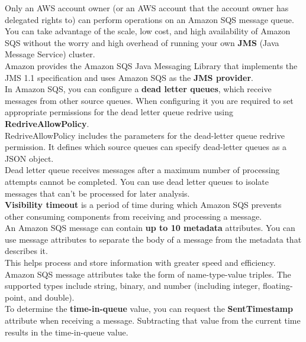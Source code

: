 \documentclass[12pt, letterpaper, twoside]{article}
\begin{document}
Only an AWS account owner (or an AWS account that the account owner has delegated rights to) can perform operations 
on an Amazon SQS message queue.\\

You can take advantage of the scale, low cost, and high availability of Amazon SQS without the worry and high 
overhead of running your own \textbf{JMS} (Java Message Service) cluster.\\
Amazon provides the Amazon SQS Java Messaging Library that implements the JMS 1.1 specification and uses 
Amazon SQS as the \textbf{JMS provider}.\\

In Amazon SQS, you can configure a \textbf{dead letter queues}, which receive messages from other source queues.
When configuring it you are required to set appropriate permissions for the dead letter queue redrive 
using \textbf{RedriveAllowPolicy}.\\
RedriveAllowPolicy includes the parameters for the dead-letter queue redrive permission. 
It defines which source queues can specify dead-letter queues as a JSON object.\\
Dead letter queue receives messages after a maximum number of processing attempts cannot be completed. 
You can use dead letter queues to isolate messages that can't be processed for later analysis.\\

\textbf{Visibility timeout} is a period of time during which Amazon SQS prevents other consuming components 
from receiving and processing a message.\\

An Amazon SQS message can contain \textbf{up to 10 metadata} attributes. You can use message attributes to separate the 
body of a message from the metadata that describes it.\\
This helps process and store information with greater speed and efficiency.\\
Amazon SQS message attributes take the form of name-type-value triples. The supported types include string, 
binary, and number (including integer, floating-point, and double).\\

To determine the \textbf{time-in-queue} value, you can request the \textbf{SentTimestamp} attribute when receiving a 
message. Subtracting that value from the current time results in the time-in-queue value.\\
\end{document}
